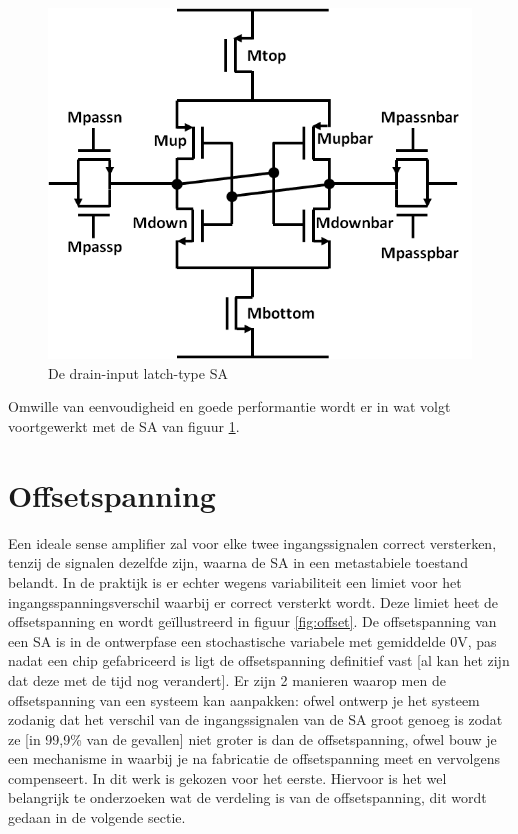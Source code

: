 \begin{figure}
  \centering
  \includegraphics[scale=0.4]{../fig/hfdstk-sensamp-ourSA.png}
  \caption[De drain-input latch-type SA]{De drain-input latch-type SA}
  \label{fig:ourSA}
\end{figure}

Omwille van eenvoudigheid en goede performantie\cite{Cos09} wordt er in wat volgt voortgewerkt met de SA van figuur \ref{fig:ourSA}.


\section{Offsetspanning}
Een ideale sense amplifier zal voor elke twee ingangssignalen correct versterken, tenzij de signalen dezelfde zijn, waarna de SA in een metastabiele toestand belandt. In de praktijk is er echter wegens variabiliteit een limiet voor het ingangsspanningsverschil waarbij er correct versterkt wordt. Deze limiet heet de offsetspanning en wordt geïllustreerd in figuur \ref{fig:offset}. De offsetspanning van een SA is in de ontwerpfase een stochastische variabele met gemiddelde 0V, pas nadat een chip gefabriceerd is ligt de offsetspanning definitief vast [al kan het zijn dat deze met de tijd nog verandert].
Er zijn 2 manieren waarop men de offsetspanning van een systeem kan aanpakken: ofwel ontwerp je het systeem zodanig dat het verschil van de ingangssignalen van de SA groot genoeg is zodat ze [in 99,9\% van de gevallen] niet groter is dan de offsetspanning, ofwel bouw je een mechanisme in waarbij je na fabricatie de offsetspanning meet en vervolgens compenseert. In dit werk is gekozen voor het eerste.
Hiervoor is het wel belangrijk te onderzoeken wat de verdeling is van de offsetspanning, dit wordt gedaan in de volgende sectie.

